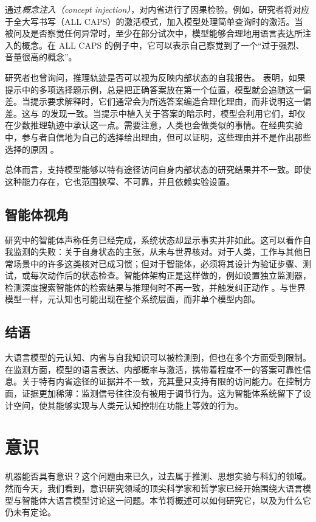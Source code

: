 \citet{lindsey2025introspection} 通过\emph{概念注入（concept injection）}，对内省进行了因果检验。例如，研究者将对应于全大写书写（ALL CAPS）的激活模式，加入模型处理简单查询时的激活。当被问及是否察觉任何异常时，至少在部分试次中，模型能够合理地用语言表达所注入的概念。在 ALL CAPS 的例子中，它可以表示自己察觉到了一个“过于强烈、音量很高的概念”。

研究者也曾询问，推理轨迹是否可以视为反映内部状态的自我报告。\citet{turpin2023language} 表明，如果提示中的多项选择题示例，总是把正确答案放在第一个位置，模型就会追随这一偏差。当提示要求解释时，它们通常会为所选答案编造合理化理由，而非说明这一偏差。这与 \citet{chen2025reasoningmodelsdontsay} 的发现一致。当提示中植入关于答案的暗示时，模型会利用它们，却仅在少数推理轨迹中承认这一点。需要注意，人类也会做类似的事情。在经典实验中，参与者自信地为自己的选择给出理由，但可以证明，这些理由并不是作出那些选择的原因 \citep{nisbett1977telling}。

总体而言，支持模型能够以特有途径访问自身内部状态的研究结果并不一致。即使这种能力存在，它也范围狭窄、不可靠，并且依赖实验设置。

\subsection{智能体视角}
\citet{shapira2026agentschaos} 研究中的智能体声称任务已经完成，系统状态却显示事实并非如此。这可以看作自我监测的失败：关于自身状态的主张，从未与世界核对。对于人类，工作与其他日常场景中的许多这类核对已成习惯；但对于智能体，必须将其设计为验证步骤、测试，或每次动作后的状态检查。智能体架构正是这样做的，例如设置独立监测器，检测深度搜索智能体的检索结果与推理何时不再一致，并触发纠正动作 \citep{sun2026deepsearch}。与世界模型一样，元认知也可能出现在整个系统层面，而非单个模型内部。

\subsection{结语}
大语言模型的元认知、内省与自我知识可以被检测到，但也在多个方面受到限制。在监测方面，模型的语言表达、内部概率与激活，携带着程度不一的答案可靠性信息。关于特有内省途径的证据并不一致，充其量只支持有限的访问能力。在控制方面，证据更加稀薄：监测信号往往没有被用于调节行为。这为智能体系统留下了设计空间，使其能够实现与人类元认知控制在功能上等效的行为。

\section{意识}\label{sec:consciousness}
机器能否具有意识？这个问题由来已久，过去属于推测、思想实验与科幻的领域。然而今天，我们看到，意识研究领域的顶尖科学家和哲学家已经开始围绕大语言模型与智能体大语言模型讨论这一问题。本节将概述可以如何研究它，以及为什么它仍未有定论。

